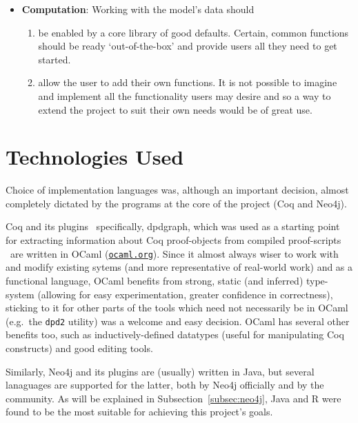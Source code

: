 \begin{itemize}
\begin{enumerate}[label=\textbf{I\arabic*},ref={I\arabic*}]
  \end{enumerate}

  \item \textbf {Computation}: Working with the model's data should
  \begin{enumerate}[label=\textbf{C\arabic*},ref={C\arabic*}]

    \item\label{req:c1} be enabled by a core library of good defaults. Certain,
      common functions should be ready `out-of-the-box' and provide users all
      they need to get started.

    \item\label{req:c2} allow the user to add their own functions. It is not
      possible to imagine and implement all the functionality users may desire
      and so a way to extend the project to suit their own needs would be of
      great use.

  \end{enumerate}


\end{itemize}

\section{Technologies Used}

Choice of implementation languages was, although an important decision, almost
completely dictated by the programs at the core of the project (Coq and Neo4j).

Coq and its plugins \textendash~specifically, dpdgraph, which was used as a
starting point for extracting information about Coq proof-objects from compiled
proof-scripts \textendash~are written in OCaml
(\href{http://ocaml.org}{\texttt{ocaml.org}}).  Since it almost always wiser to
work with and modify existing sytems (and more representative of real-world
work) and as a functional language, OCaml benefits from strong, static (and
inferred) type-system (allowing for easy experimentation, greater confidence in
correctness), sticking to it for other parts of the tools which need not
necessarily be in OCaml (e.g.\ the \texttt{dpd2} utility) was a welcome and
easy decision. OCaml has several other benefits too, such as
inductively-defined datatypes (useful for manipulating Coq constructs) and good
editing tools.

Similarly, Neo4j and its plugins are (usually) written in Java, but several
lanaguages are supported for the latter, both by Neo4j officially and by the
community. As will be explained in Subsection~\ref{subsec:neo4j}, Java
and R were found to be the most suitable for achieving this project's goals.

